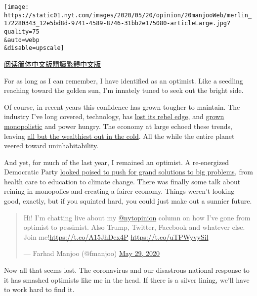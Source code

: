 \texttt{[image: https://static01.nyt.com/images/2020/05/20/opinion/20manjooWeb/merlin\_172280343\_12e5bd8d-9741-4589-8746-31bb2e175080-articleLarge.jpg?quality=75\\\&auto=webp\\\&disable=upscale]}

\href{https://cn.nytimes.com/opinion/20200521/coronavirus-worst-case/}{阅读简体中文版}\href{https://cn.nytimes.com/opinion/20200521/coronavirus-worst-case/zh-hant/}{閱讀繁體中文版}

For as long as I can remember, I have identified as an optimist. Like a
seedling reaching toward the golden sun, I'm innately tuned to seek out
the bright side.

Of course, in recent years this confidence has grown tougher to
maintain. The industry I've long covered, technology, has
\href{https://www.businessinsider.com/employees-lament-the-open-culture-that-made-google-famous-2020-5}{lost
its rebel edge}, and
\href{https://www.nytimes.com/2017/10/18/technology/frightful-five-start-ups.html}{grown
monopolistic} and power hungry. The economy at large echoed these
trends, leaving
\href{https://www.nytimes.com/2020/04/09/opinion/sunday/inequality-coronavirus.html}{all
but the wealthiest out in the cold}. All the while the entire planet
veered toward uninhabitability.

And yet, for much of the last year, I remained an optimist. A
re-energized Democratic Party
\href{https://www.nytimes.com/2019/06/05/opinion/elizabeth-warren-america.html}{looked
poised to push for grand solutions to big problems}, from health care to
education to climate change. There was finally some talk about reining
in monopolies and creating a fairer economy. Things weren't looking
good, exactly, but if you squinted hard, you could just make out a
sunnier future.

\begin{quote}
Hi! I'm chatting live about my
\href{https://twitter.com/nytopinion?ref_src=twsrc\%5Etfw}{@nytopinion}
column on how I've gone from optimist to pessimist. Also Trump, Twitter,
Facebook and whatever else. Join
me!\href{https://t.co/A15JhDex4P}{https://t.co/A15JhDex4P}
\href{https://t.co/uTPWyvySil}{https://t.co/uTPWyvySil}

--- Farhad Manjoo (@fmanjoo)
\href{https://twitter.com/fmanjoo/status/1266414229713637376?ref_src=twsrc\%5Etfw}{May
29, 2020}
\end{quote}

Now all that seems lost. The coronavirus and our disastrous national
response to it has smashed optimists like me in the head. If there is a
silver lining, we'll have to work hard to find it.

